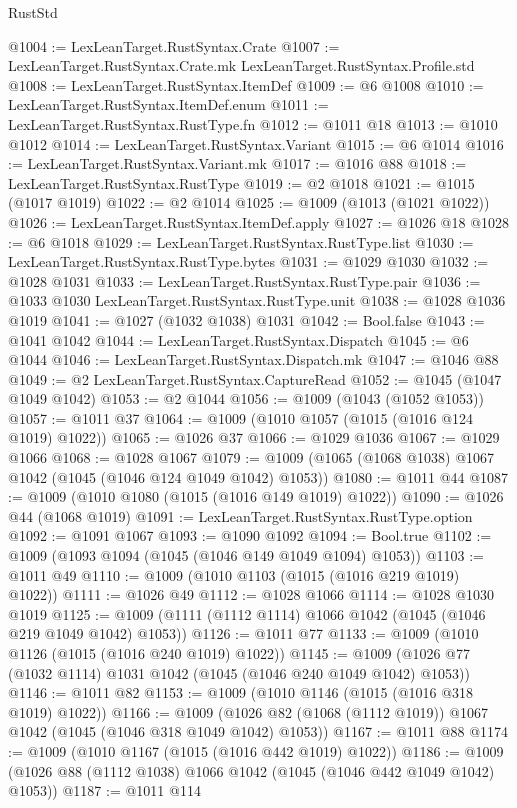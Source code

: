 \begin{lexlean}{RustStd}
\begin{coremodule}
{\begin{coremodule}
{{{{{{{{{{{{{{{{{{{{{{{{{{{{{{{{{{{@1004 := LexLeanTarget.RustSyntax.Crate
@1007 := LexLeanTarget.RustSyntax.Crate.mk LexLeanTarget.RustSyntax.Profile.std
@1008 := LexLeanTarget.RustSyntax.ItemDef
@1009 := @6 @1008
@1010 := LexLeanTarget.RustSyntax.ItemDef.enum
@1011 := LexLeanTarget.RustSyntax.RustType.fn
@1012 := @1011 @18
@1013 := @1010 @1012
@1014 := LexLeanTarget.RustSyntax.Variant
@1015 := @6 @1014
@1016 := LexLeanTarget.RustSyntax.Variant.mk
@1017 := @1016 @88
@1018 := LexLeanTarget.RustSyntax.RustType
@1019 := @2 @1018
@1021 := @1015 (@1017 @1019)
@1022 := @2 @1014
@1025 := @1009 (@1013 (@1021 @1022))
@1026 := LexLeanTarget.RustSyntax.ItemDef.apply
@1027 := @1026 @18
@1028 := @6 @1018
@1029 := LexLeanTarget.RustSyntax.RustType.list
@1030 := LexLeanTarget.RustSyntax.RustType.bytes
@1031 := @1029 @1030
@1032 := @1028 @1031
@1033 := LexLeanTarget.RustSyntax.RustType.pair
@1036 := @1033 @1030 LexLeanTarget.RustSyntax.RustType.unit
@1038 := @1028 @1036 @1019
@1041 := @1027 (@1032 @1038) @1031
@1042 := Bool.false
@1043 := @1041 @1042
@1044 := LexLeanTarget.RustSyntax.Dispatch
@1045 := @6 @1044
@1046 := LexLeanTarget.RustSyntax.Dispatch.mk
@1047 := @1046 @88
@1049 := @2 LexLeanTarget.RustSyntax.CaptureRead
@1052 := @1045 (@1047 @1049 @1042)
@1053 := @2 @1044
@1056 := @1009 (@1043 (@1052 @1053))
@1057 := @1011 @37
@1064 := @1009 (@1010 @1057 (@1015 (@1016 @124 @1019) @1022))
@1065 := @1026 @37
@1066 := @1029 @1036
@1067 := @1029 @1066
@1068 := @1028 @1067
@1079 := @1009 (@1065 (@1068 @1038) @1067 @1042 (@1045 (@1046 @124 @1049 @1042) @1053))
@1080 := @1011 @44
@1087 := @1009 (@1010 @1080 (@1015 (@1016 @149 @1019) @1022))
@1090 := @1026 @44 (@1068 @1019)
@1091 := LexLeanTarget.RustSyntax.RustType.option
@1092 := @1091 @1067
@1093 := @1090 @1092
@1094 := Bool.true
@1102 := @1009 (@1093 @1094 (@1045 (@1046 @149 @1049 @1094) @1053))
@1103 := @1011 @49
@1110 := @1009 (@1010 @1103 (@1015 (@1016 @219 @1019) @1022))
@1111 := @1026 @49
@1112 := @1028 @1066
@1114 := @1028 @1030 @1019
@1125 := @1009 (@1111 (@1112 @1114) @1066 @1042 (@1045 (@1046 @219 @1049 @1042) @1053))
@1126 := @1011 @77
@1133 := @1009 (@1010 @1126 (@1015 (@1016 @240 @1019) @1022))
@1145 := @1009 (@1026 @77 (@1032 @1114) @1031 @1042 (@1045 (@1046 @240 @1049 @1042) @1053))
@1146 := @1011 @82
@1153 := @1009 (@1010 @1146 (@1015 (@1016 @318 @1019) @1022))
@1166 := @1009 (@1026 @82 (@1068 (@1112 @1019)) @1067 @1042 (@1045 (@1046 @318 @1049 @1042) @1053))
@1167 := @1011 @88
@1174 := @1009 (@1010 @1167 (@1015 (@1016 @442 @1019) @1022))
@1186 := @1009 (@1026 @88 (@1112 @1038) @1066 @1042 (@1045 (@1046 @442 @1049 @1042) @1053))
@1187 := @1011 @114
}}}}}}}}}}}}}}}}}}}}}}}}}}}}}}}}}}}
\end{coremodule}}
\end{coremodule}
\end{lexlean}
